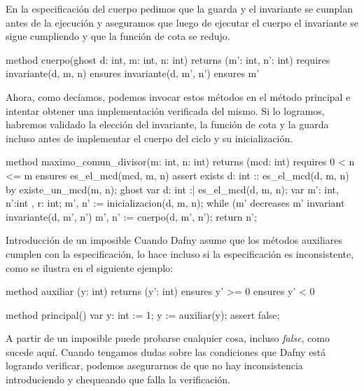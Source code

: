 \documentclass[12pt, a4paper, openany, fleqn]{book}
\begin{document}
    En la especificación del cuerpo pedimos que la guarda y el invariante se cumplan antes de la ejecución y aseguramos que luego de ejecutar el cuerpo el invariante se sigue cumpliendo y que la función de cota se redujo.


    \begin{greenbox}
    \begin{dafny}[gobble=8]
        method cuerpo(ghost d: int, m: int, n: int)
            returns (m': int, n': int)
            requires invariante(d, m, n)
            ensures invariante(d, m', n')
            ensures m' %
    \end{dafny}
    \end{greenbox}

    Ahora, como decíamos, podemos invocar estos métodos en el método principal e intentar obtener una implementación verificada del mismo. Si lo logramos, habremos validado la elección del invariante, la función de cota y la guarda incluso antes de implementar el cuerpo del ciclo y su inicialización.


    \begin{greenbox}
    \begin{dafny}[gobble=8]
        method maximo_comun_divisor(m: int, n: int) returns (mcd: int)
            requires 0 < n <= m
            ensures es_el_mcd(mcd, m, n)
        {
            assert exists d: int :: es_el_mcd(d, m, n) by {
                existe_un_mcd(m, n);
            }
            ghost var d: int :| es_el_mcd(d, m, n);
            var m': int, n':int , r: int;
            m', n' := inicializacion(d, m, n);
            while (m' %
                decreases m' %
                invariant invariante(d, m', n')
            {
                m', n' := cuerpo(d, m', n');
            }
            return n';
        }
    \end{dafny}
    \end{greenbox}


    \begin{warningbox}{Introducción de un imposible}
    Cuando Dafny asume que los métodos auxiliares cumplen con la especificación, lo hace incluso si la especificación es inconsistente, como se ilustra en el siguiente ejemplo:

    \begin{greenbox}
    \begin{dafny}[gobble=8]
        method auxiliar (y: int) returns (y': int)
            ensures y' >= 0
            ensures y' < 0

        method principal() {
            var y: int := 1;
            y := auxiliar(y);
            assert false;
        }
    \end{dafny}
    \end{greenbox}

    A partir de un imposible puede probarse cualquier cosa, incluso \textit{false}, como sucede aquí. Cuando tengamos dudas sobre las condiciones que Dafny está logrando verificar, podemos asegurarnos de que no hay inconsistencia introduciendo  y chequeando que falla la verificación.
\end{warningbox}
\end{document}

